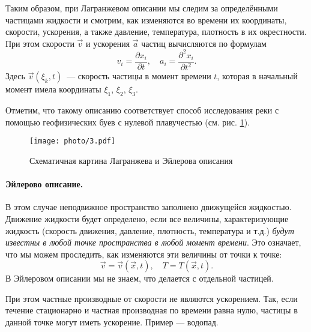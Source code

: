 Таким образом, при Лагранжевом описании мы следим за определёнными частицами жидкости и смотрим, как изменяются во времени их координаты,  скорости, ускорения, а также давление, температура, плотность в их окрестности.\\
При этом скорости $\vec{v}$ и ускорения $\vec{a}$ частиц вычисляются по формулам
\begin{equation}
	v_{i} =\frac{\partial x_{i}}{\partial t}, \quad
	a_{i} =\frac{\partial^{2} x_{i}}{\partial t^{2}}.
\end{equation}
Здесь $ \vec{v}\left(\xi_{k}, t\right) $~--- скорость частицы в момент времени $t$, которая в начальный момент имела координаты $\xi_1$, $\xi_2$, $\xi_3$.

Отметим, что такому описанию соответствует способ исследования реки с помощью геофизических буев с нулевой плавучестью (см. рис. \ref{fig:figure3}).
\begin{figure}[H]
	\centering
	\texttt{[image: photo/3.pdf]}
	\caption{Схематичная картина Лагранжева и Эйлерова описания}%
	\label{fig:figure3}
\end{figure}
\paragraph{Эйлерово описание.} В этом случае неподвижное пространство заполнено движущейся жидкостью. Движение жидкости будет определено, если все величины, характеризующие жидкость (скорость движения, давление, плотность, температура и т.д.) \textit{будут известны в любой точке пространства в любой момент времени}.
Это означает, что мы можем проследить, как изменяются эти величины от точки к точке:
\begin{equation}
	\vec{v} =\vec{v}(\vec{x}, t), \quad
	T = T(\vec{x}, t).
\end{equation}
В Эйлеровом описании мы не знаем, что делается с отдельной частицей.

При этом частные производные от скорости не являются ускорением. Так, если течение стационарно и частная производная по времени  равна нулю, частицы в данной точке могут иметь ускорение. Пример --- водопад.

